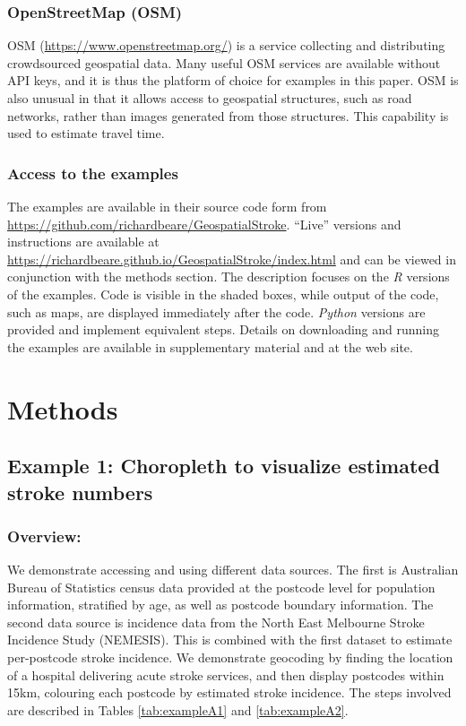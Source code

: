 \documentclass[utf8]{frontiersHLTH}
\begin{document}
\subsubsection{OpenStreetMap (OSM)}\label{openstreetmap-osm} 
OSM (\url{https://www.openstreetmap.org/}) is a service collecting and
distributing crowdsourced geospatial data. Many useful OSM services
are available without API keys, and it is thus the platform of choice
for examples in this paper. OSM is also unusual in that it allows
access to geospatial structures, such as road networks, rather than
images generated from those structures. This capability is used to
estimate travel time.

\subsubsection{Access to the examples}\label{access-to-the-examples} 
The examples are available in their source code form from
\href{https://github.com/richardbeare/GeospatialStroke}{https://github.com/richardbeare/GeospatialStroke}. ``Live''
versions and instructions are available at
\href{https://richardbeare.github.io/GeospatialStroke/index.html}{https://richardbeare.github.io/GeospatialStroke/index.html}
and can be viewed in conjunction with the methods section. The
description focuses on the {\em R} versions of the examples. Code is
visible in the shaded boxes, while output of the code, such as maps,
are displayed immediately after the code. {\em Python} versions are
provided and implement equivalent steps. Details on downloading and
running the examples are available in supplementary material and at
the web site.

\section{Methods}\label{methods} 
\subsection{Example 1: Choropleth to visualize estimated stroke numbers}\label{example-1-choropleth-to-visualize-estimated-stroke-numbers} 

\subsubsection{Overview:}\label{overview} 
We demonstrate accessing and using different data sources. The first
is Australian Bureau of Statistics census data provided at the
postcode level for population information, stratified by age, as well
as postcode boundary information. The second data source is incidence
data from the North East Melbourne Stroke Incidence Study
(NEMESIS)\cite{thrift_stroke_2000}. This is combined with the first
dataset to estimate per-postcode stroke incidence. We demonstrate
geocoding by finding the location of a hospital delivering acute
stroke services, and then display postcodes within 15km, colouring
each postcode by estimated stroke incidence. The steps involved are
described in Tables \ref{tab:exampleA1} and \ref{tab:exampleA2}.
\end{document}
